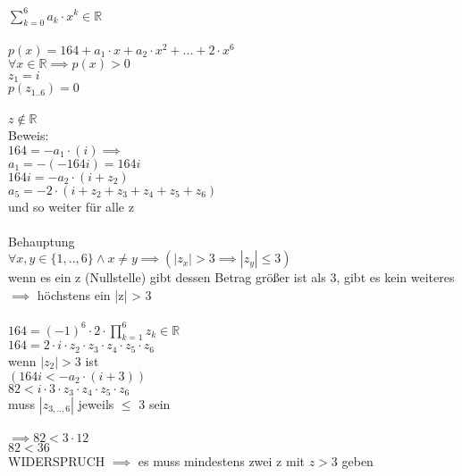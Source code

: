 \( \displaystyle\sum_{k=0}^{6} {a_k\cdot x^k} \in \mathbb{R}  \)
\\
\\
\(p(x) = 164 + a_{1} \cdot x + a_{2} \cdot x^2 + ... + 2 \cdot x^6\)\\
\(\forall x \in \mathbb{R} \implies p(x) > 0 \) \\
\(z_{1}=i\)\\
\(p(z_{1..6})=0 \)\\
\\\(z \notin \mathbb{R}\) \\ Beweis:\\
\(164 = -a_{1}  \cdot (i) \implies  \)\\
\(a_{1} = -(-164i) = 164i\)\\
\(164i = -a_{2}  \cdot (i + z_{2})\)\\
\(a_{5} = -2  \cdot (i +z_{2}+z_{3}+z_{4}+z_{5}+z_{6})\)\\
und so weiter für alle z\\
\\
Behauptung\\
\(\forall x,y \in \{1,.. ,6\} \land x \neq y \implies (|z_{x}| > 3 \implies |z_{y}| \leq 3 )\) \\
wenn es ein z (Nullstelle) gibt dessen Betrag größer ist als 3, gibt es kein weiteres \(\implies\)
höchstens ein |z| > 3\\
\\
\(164 = (-1)^6  \cdot 2  \cdot \displaystyle\prod_{k=1}^{6} {z_{k}} \in \mathbb{R}\)\\
\(164 = 2  \cdot i  \cdot z_{2}\cdot  z_{3}\cdot  z_{4}\cdot  z_{5}\cdot  z_{6}\)\\
wenn \(|z_{2}| > 3 \) ist\\
\((164i < -a_{2}  \cdot (i + 3))\)\\
\(82 < i  \cdot  3  \cdot z_{3} \cdot z_{4} \cdot z_{5} \cdot z_{6}  \)\\
muss \(|z_{3,..,6}|\) jeweils \(\leq\) 3 sein\\
\\
\(\implies 82 < 3 \cdot 12 \)  \\
\(82 < 36\)\\
WIDERSPRUCH  \(\implies\) es muss mindestens zwei z mit \(z > 3\) geben\\


\item~\\


